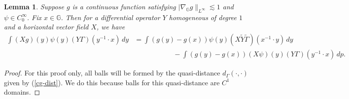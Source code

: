 \documentclass[12pt,a4paper,reqno]{amsart}
\newcommand{\wt}{\widetilde}
\newcommand{\cg}{\Gamma}
\newcommand{\G}{\mathbb{G}}
\numberwithin{equation}{section}
\newtheorem{lem}[thm]{Lemma}
\theoremstyle{definition}
\begin{document}
\begin{lem}\label{real-ibp}
Suppose $g$ is a continuous function satisfying $|\nabla_{\G} g\|_{L^{\infty}} \lesssim 1$ and $\psi \in C_0^{\infty}$. Fix $x \in \G$. Then for a differential operator $Y$ homogeneous of degree $1$ and a horizontal vector field $X$, we have \begin{align*}
 \int (Xg)(y)\psi(y)(Y \cg)(y^{-1}\cdot x)\,dy &= \int (g(y) - g(x)) \psi(y) (X \wt{Y}\wt{\cg})(x^{-1}\cdot y)\,dy \\ &\,\,\,\,\,\,\,\,\,\,\,\,\,\,\,\,\,\,\,\,\,\,\,\,\,\,\,\,\,\,\,\,\,\,- \int (g(y)-g(x)) (X \psi)(y)(Y \cg)(y^{-1}\cdot x)\,dp. 
\end{align*}
\end{lem}
\begin{proof}
For this proof only, all balls will be formed by the quasi-distance $d_{\cg}(\cdot, \cdot)$ given by (\ref{cg-dist}). We do this because balls for this quasi-distance are $C^1$ domains.


\end{proof}
\end{document}
